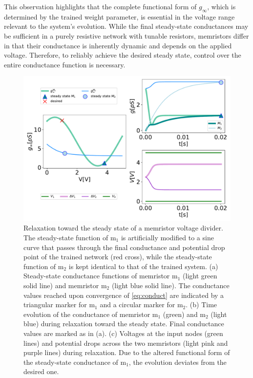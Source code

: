 \documentclass[reprint,superscriptaddress,prb,showkeys]{revtex4-2}
\newcommand{\m}{\text{m}} %
\begin{document}
This observation highlights that the complete functional form of $g_{\infty}$, which is determined by the trained weight parameter, is essential in the voltage range relevant to the system’s evolution. While the final steady-state conductances may be sufficient in a purely resistive network with tunable resistors, memristors differ in that their conductance is inherently dynamic and depends on the applied voltage. Therefore, to reliably achieve the desired steady state, control over the entire conductance function is necessary.

\begin{figure}[h]
    \centering
    \includegraphics[width=\columnwidth]{plots/appendixA/grid_trained_change_func.pdf}
    \caption{Relaxation toward the steady state of a memristor voltage divider. The steady-state function of $\m_1$ is artificially modified to a sine curve that passes through the final conductance and potential drop point of the trained network (red cross), while the steady-state function of $\m_2$ is kept identical to that of the trained system. (a) Steady-state conductance functions of memristor $\m_1$ (light green solid line) and memristor $\m_2$ (light blue solid line). The conductance values reached upon convergence of \cref{eq:conduct} are indicated by a triangular marker for $\m_1$ and a circular marker for $\m_2$. (b) Time evolution of the conductance of memristor $\m_1$ (green) and $\m_2$ (light blue) during relaxation toward the steady state. Final conductance values are marked as in (a). (c) Voltages at the input nodes (green lines) and potential drops across the two memristors (light pink and purple lines) during relaxation. Due to the altered functional form of the steady-state conductance of $\m_1$, the evolution deviates from the desired one.
    }
    \label{fig:changed_func_ginfty}
\end{figure} 



\clearpage
 

\end{document}
